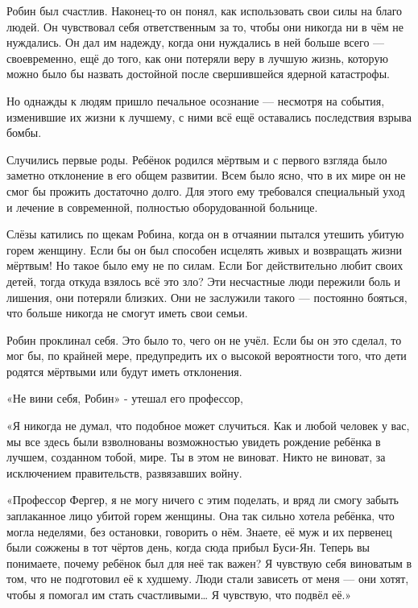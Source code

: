 \documentclass[a4paper,12pt]{book}
\begin{document}
\par
Робин был счастлив. Наконец-то он понял, как использовать свои силы на благо людей. Он чувствовал себя ответственным за то, чтобы они никогда ни в чём не нуждались. Он дал им надежду, когда они нуждались в ней больше всего — своевременно, ещё до того, как они потеряли веру в лучшую жизнь, которую можно было бы назвать достойной после свершившейся ядерной катастрофы.\\
\par
Но однажды к людям пришло печальное осознание — несмотря на события, изменившие их жизни к лучшему, с ними всё ещё оставались последствия взрыва бомбы.
\par
Случились первые роды. Ребёнок родился мёртвым и с первого взгляда было заметно отклонение в его общем развитии. Всем было ясно, что в их мире он не смог бы прожить достаточно долго. Для этого ему требовался специальный уход и лечение в современной, полностью оборудованной больнице.
\par
Слёзы катились по щекам Робина, когда он в отчаянии пытался утешить убитую горем женщину. Если бы он был способен исцелять живых и возвращать жизни мёртвым! Но такое было ему не по силам. Если Бог действительно любит своих детей, тогда откуда взялось всё это зло? Эти несчастные люди пережили боль и лишения, они потеряли близких. Они не заслужили такого — постоянно бояться, что больше никогда не смогут иметь свои семьи.
\par
Робин проклинал себя. Это было то, чего он не учёл. Если бы он это сделал, то мог бы, по крайней мере, предупредить их о высокой вероятности того, что дети родятся мёртвыми или будут иметь отклонения.
\par
«Не вини себя, Робин» - утешал его профессор,
\par
«Я никогда не думал, что подобное может случиться. Как и любой человек у вас, мы все здесь были взволнованы возможностью увидеть рождение ребёнка в лучшем, созданном тобой, мире. Ты в этом не виноват. Никто не виноват, за исключением правительств, развязавших войну.
\par
«Профессор Фергер, я не могу ничего с этим поделать, и вряд ли смогу забыть заплаканное лицо убитой горем женщины. Она так сильно хотела ребёнка, что могла неделями, без остановки, говорить о нём. Знаете, её муж и их первенец были сожжены в тот чёртов день, когда сюда прибыл Буси-Ян. Теперь вы понимаете, почему ребёнок был для неё так важен? Я чувствую себя виноватым в том, что не подготовил её к худшему. Люди стали зависеть от меня — они хотят, чтобы я помогал им стать счастливыми… Я чувствую, что подвёл её.»
\end{document}
